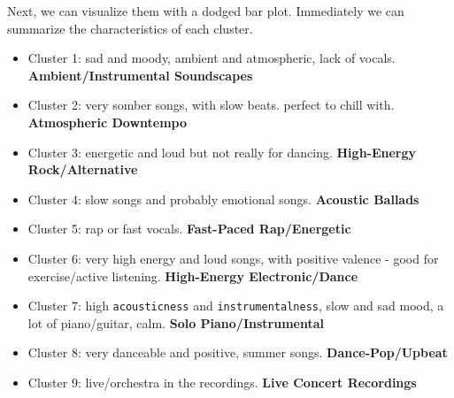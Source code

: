 \documentclass[
]{article}
\begin{document}
Next, we can visualize them with a dodged bar plot. Immediately we can
summarize the characteristics of each cluster.

\begin{itemize}
\item
  Cluster 1: sad and moody, ambient and atmospheric, lack of vocals.
  \textbf{Ambient/Instrumental Soundscapes}
\item
  Cluster 2: very somber songs, with slow beats. perfect to chill with.
  \textbf{Atmospheric Downtempo}
\item
  Cluster 3: energetic and loud but not really for dancing.
  \textbf{High-Energy Rock/Alternative}
\item
  Cluster 4: slow songs and probably emotional songs. \textbf{Acoustic
  Ballads}
\item
  Cluster 5: rap or fast vocals. \textbf{Fast-Paced Rap/Energetic}
\item
  Cluster 6: very high energy and loud songs, with positive valence -
  good for exercise/active listening. \textbf{High-Energy
  Electronic/Dance}
\item
  Cluster 7: high \texttt{acousticness} and \texttt{instrumentalness},
  slow and sad mood, a lot of piano/guitar, calm. \textbf{Solo
  Piano/Instrumental}
\item
  Cluster 8: very danceable and positive, summer songs.
  \textbf{Dance-Pop/Upbeat}
\item
  Cluster 9: live/orchestra in the recordings. \textbf{Live Concert
  Recordings}
\end{itemize}
\end{document}
